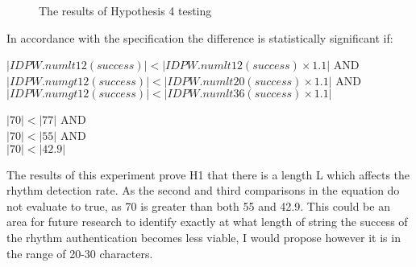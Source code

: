 \documentclass{article}
\begin{document}
\begin{figure} [H]
    \centering
    \caption{The results of Hypothesis 4 testing}
    \label{fig:boxPlotHyp4}
\end{figure}

In accordance with the specification the difference is statistically significant if: 
\begin{center}
    $ |IDPW.numlt12(success)| < |IDPW.numlt12(success) \times 1.1| $ AND \\
    $ |IDPW.numgt12(success)| < |IDPW.numlt20(success) \times 1.1| $ AND \\
    $ |IDPW.numgt12(success)| < |IDPW.numlt36(success) \times 1.1| $ \\
\end{center} 

\begin{center}
    $ |70| < |77| $ AND \\
    $ |70| < |55| $ AND \\
    $ |70| < |42.9| $ \\
\end{center} 


The results of this experiment prove H1 that there	is	a length L	which	affects	the	rhythm	detection	rate. As the second and third comparisons in the equation do not evaluate to true, as 70 is greater than both 55 and 42.9. This could be an area for future research to identify exactly at what length of string the success of the rhythm authentication becomes less viable, I would propose however it is in the range of 20-30 characters. 
\end{document}
